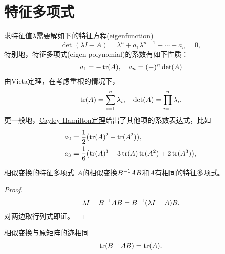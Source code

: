 \section{特征多项式}
求特征值$\lambda$需要解如下的特征方程(eigenfunction)
\[
	\det(\lambda I-A)=\lambda^n+a_1\lambda^{n-1}+\cdots+a_n=0,
\]
特别地，特征多项式(eigen-polynomial)的系数有如下性质：
\begin{align}
	a_1=-\operatorname{tr}(A),\quad a_n=(-)^n\det(A)
\end{align}
由Vieta定理，在考虑重根的情况下，
\begin{align}
	\operatorname{tr}(A)=\sum_{i=1}^n\lambda_i,\quad \det(A)=\prod_{i=1}^n\lambda_i.
\end{align}
更一般地，\href{https://en.wikipedia.org/wiki/Cayley%E2%80%93Hamilton_theorem}{Cayley-Hamilton定理}给出了其他项的系数表达式，比如
\begin{subequations}
	\begin{align}
		a_2&=\frac12\bigl(\operatorname{tr}(A)^2-\operatorname{tr}(A^2)\bigr),\\
		a_3&=\frac16\bigl(\operatorname{tr}(A)^3-3\operatorname{tr}(A)\operatorname{tr}(A^2)+2\operatorname{tr}(A^3)\bigr),
	\end{align}
\end{subequations}
\begin{theorem}{相似变换的特征多项式}{}
	$A$的相似变换$B^{-1} AB$和$A$有相同的特征多项式。
\end{theorem}
\begin{proof}
	\[
		\lambda I-B^{-1} AB=B^{-1}(\lambda I-A)B.
	\]
	对两边取行列式即证。
\end{proof}
\begin{corollary}
	相似变换与原矩阵的迹相同
	\begin{equation}
		\operatorname{tr}(B^{-1} AB)=\operatorname{tr}(A).
	\end{equation}
\end{corollary}

